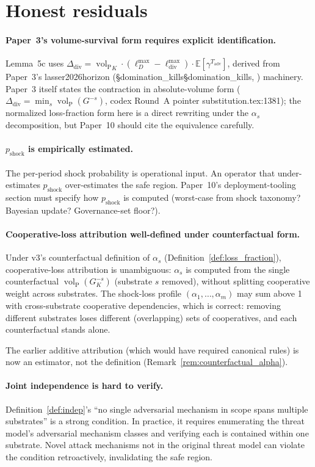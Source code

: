 \documentclass{article}
\makeatletter
\newcommand{\citep}[2][]{%
  \begingroup
  \def\@tmpkey{#2}%
  \ifx\@tmpkey\@empty\else
    (\ifx\@empty#1\@empty\else #1, \fi
     \@nameuse{bibkey@\@tmpkey})%
  \fi
  \endgroup
}
\DeclareMathOperator{\vol}{vol}
\newcommand{\volL}{{\vol_{\mathrm{P}}}}
\newcommand{\Tadv}{T_{\mathrm{adv}}}
\newcommand{\Ddiv}{\Delta_{\mathrm{div}}}
\newcommand{\pshock}{p_{\mathrm{shock}}}
\newcommand{\lossDmax}{\ell_D^{\max}}
\newcommand{\lossdivmax}{\ell_{\mathrm{div}}^{\max}}
\makeatother
\begin{document}
\section{Honest residuals}

\paragraph{Paper~3's volume-survival form requires explicit identification.}
Lemma~5c uses $\Ddiv = \volL_K \cdot (\lossDmax - \lossdivmax) \cdot
\mathbb{E}[\gamma^{\Tadv}]$, derived from Paper~3's
\citep[\S domination\_kills]{lasser2026horizon} machinery.  Paper~3
itself states the contraction in absolute-volume form
($\Ddiv = \min_s \volL(G^{-s})$, codex Round~A pointer
substitution.tex:1381); the normalized loss-fraction form here is a
direct rewriting under the $\alpha_s$ decomposition, but Paper~10
should cite the equivalence carefully.

\paragraph{$\pshock$ is empirically estimated.}
The per-period shock probability is operational input.  An operator
that under-estimates $\pshock$ over-estimates the safe region.
Paper~10's deployment-tooling section must specify how $\pshock$ is
computed (worst-case from shock taxonomy?  Bayesian update?
Governance-set floor?).

\paragraph{Cooperative-loss attribution well-defined under counterfactual form.}
Under v3's counterfactual definition of $\alpha_s$
(Definition~\ref{def:loss_fraction}), cooperative-loss attribution
is unambiguous: $\alpha_s$ is computed from the single counterfactual
$\volL(G_K^{-s})$ (substrate $s$ removed), without splitting
cooperative weight across substrates.  The shock-loss profile
$(\alpha_1, \ldots, \alpha_m)$ may sum above 1 with cross-substrate
cooperative dependencies, which is correct: removing different
substrates loses different (overlapping) sets of cooperatives, and
each counterfactual stands alone.

The earlier additive attribution (which would have required canonical
rules) is now an estimator, not the definition
(Remark~\ref{rem:counterfactual_alpha}).

\paragraph{Joint independence is hard to verify.}
Definition~\ref{def:indep}'s ``no single adversarial mechanism in
scope spans multiple substrates'' is a strong condition.  In practice,
it requires enumerating the threat model's adversarial mechanism
classes and verifying each is contained within one substrate.  Novel
attack mechanisms not in the original threat model can violate the
condition retroactively, invalidating the safe region.
\end{document}
